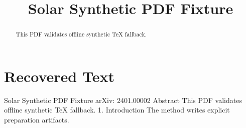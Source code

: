 \title{Solar Synthetic PDF Fixture}

\maketitle

\begin{abstract}
This PDF validates offline synthetic TeX fallback.
\end{abstract}

\section{Recovered Text}
Solar Synthetic PDF Fixture
arXiv: 2401.00002
Abstract
This PDF validates offline synthetic TeX fallback.
1. Introduction
The method writes explicit preparation artifacts.

